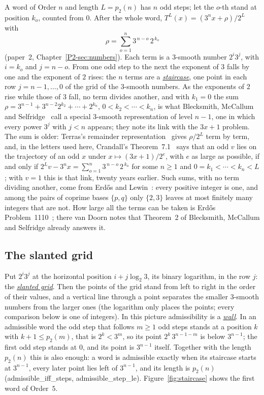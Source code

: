 \documentclass[10pt,a4paper,titlepage]{article}
\makeatletter
\newcommand{\termhere}[1]{\leavevmode
  \Hy@raisedlink{\hyper@anchorstart{term:#1}\hyper@anchorend}}
\newcommand{\keyterm}[2]{\hyperlink{box:#1}{\emph{#2}}}
\newcommand{\lean}[1]{\textsf{#1}}
\makeatother
\begin{document}
\termhere{staircase}A word of Order $n$ and length $L = p_2(n)$ has $n$ odd steps; let the $o$-th stand at position $k_o$, counted from
$0$. After the whole word, $T^L(x) = (3^n x + \rho)/2^L$ with
\[
\rho = \sum_{o=1}^{n} 3^{\,n-o}\,2^{\,k_o}
\]
(paper~2, Chapter~\ref{P2-sec:numbers}). Each term is a $3$-smooth number $2^i 3^j$, with
$i = k_o$ and $j = n - o$. From one odd step to the next the exponent of $3$ falls by one
and the exponent of $2$ rises: the $n$ terms are a \keyterm{staircase}{staircase}, one point in each row
$j = n-1, \dots, 0$ of the grid of the $3$-smooth numbers.
As the exponents of $2$ rise while those of $3$ fall, no term divides another, and with
$k_1 = 0$ the sum $\rho = 3^{n-1} + 3^{n-2}2^{k_2} + \cdots + 2^{k_n}$, $0 < k_2 < \cdots < k_n$, is
what Blecksmith, McCallum and Selfridge~\cite{Blecksmith1998} call a special $3$-smooth
representation of level $n - 1$, one in which every power $3^j$ with $j < n$ appears; they
note its link with the $3x + 1$ problem.
The sum is older: Terras's remainder representation~\cite[Thm.~1.1]{Terras1976} gives $\rho/2^L$ term by term, and,
in the letters used here, Crandall's Theorem~7.1~\cite{Crandall1978} says that an odd $v$
lies on the trajectory of an odd $x$ under $x \mapsto (3x + 1)/2^e$, with $e$ as large as possible, if and only if
$2^L v - 3^n x = \sum_{o=1}^{n} 3^{\,n-o}\,2^{\,k_o}$ for some $n \ge 1$ and $0 = k_1 < \cdots < k_n < L$;
with $v = 1$ this is that link, twenty years earlier.
Such sums, with no term dividing another, come from Erd\H{o}s and Lewin~\cite{ErdosLewin1996}:
every positive integer is one, and among the pairs of coprime bases $\{p, q\}$ only $\{2, 3\}$
leaves at most finitely many integers that are not. How large all the terms can be taken
is Erd\H{o}s Problem~1110~\cite{Bloom1110}; there van Doorn notes that Theorem~2 of
Blecksmith, McCallum and Selfridge already answers it.

\subsection*{The slanted grid}

\termhere{slanted}Put $2^i 3^j$ at the horizontal position $i + j\log_2 3$, its binary logarithm, in the row
$j$: the \keyterm{slanted}{slanted grid}. Then the points of the grid stand from left to right in the order of their values, and
a vertical line through a point separates the smaller $3$-smooth numbers from the larger
ones (the logarithm only places the points; every comparison below is one of integers).
\termhere{wall}In this picture admissibility is a \keyterm{wall}{wall}. In an admissible word the odd step that follows
$m \ge 1$ odd steps stands at a position $k$ with $k + 1 \le p_2(m)$, that is
$2^k < 3^m$, so its point $2^k\,3^{n-1-m}$ is below $3^{n-1}$; the first odd step stands
at $0$, and its point is $3^{n-1}$ itself. Together with the length $p_2(n)$ this is also
enough: a word is admissible exactly when its staircase starts at $3^{n-1}$, every later
point lies left of $3^{n-1}$, and its length is $p_2(n)$ (\lean{admissible\_iff\_steps},
\lean{admissible\_step\_le}). Figure~\ref{fig:staircase} shows the first word of Order~$5$.
\end{document}
